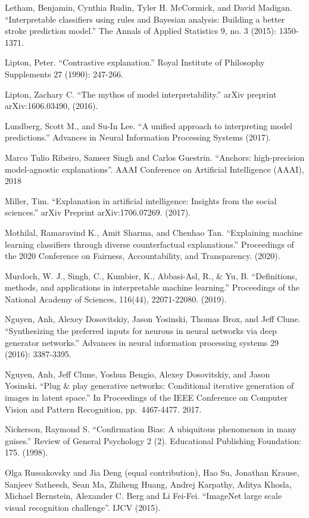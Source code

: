 \documentclass[
  11pt,
]{scrbook}
\begin{document}
Letham, Benjamin, Cynthia Rudin, Tyler H. McCormick, and David Madigan. ``Interpretable classifiers using rules and Bayesian analysis: Building a better stroke prediction model.'' The Annals of Applied Statistics 9, no. 3 (2015): 1350-1371.

Lipton, Peter. ``Contrastive explanation.'' Royal Institute of Philosophy Supplements 27 (1990): 247-266.

Lipton, Zachary C. ``The mythos of model interpretability.'' arXiv preprint arXiv:1606.03490, (2016).

Lundberg, Scott M., and Su-In Lee. ``A unified approach to interpreting model predictions.'' Advances in Neural Information Processing Systems (2017).

Marco Tulio Ribeiro, Sameer Singh and Carlos Guestrin. ``Anchors: high-precision model-agnostic explanations''. AAAI Conference on Artificial Intelligence (AAAI), 2018

Miller, Tim. ``Explanation in artificial intelligence: Insights from the social sciences.'' arXiv Preprint arXiv:1706.07269. (2017).

Mothilal, Ramaravind K., Amit Sharma, and Chenhao Tan. ``Explaining machine learning classifiers through diverse counterfactual explanations.'' Proceedings of the 2020 Conference on Fairness, Accountability, and Transparency. (2020).

Murdoch, W. J., Singh, C., Kumbier, K., Abbasi-Asl, R., \& Yu, B. ``Definitions, methods, and applications in interpretable machine learning.'' Proceedings of the National Academy of Sciences, 116(44), 22071-22080. (2019).

Nguyen, Anh, Alexey Dosovitskiy, Jason Yosinski, Thomas Brox, and Jeff Clune. ``Synthesizing the preferred inputs for neurons in neural networks via deep generator networks.'' Advances in neural information processing systems 29 (2016): 3387-3395.

Nguyen, Anh, Jeff Clune, Yoshua Bengio, Alexey Dosovitskiy, and Jason Yosinski. ``Plug \& play generative networks: Conditional iterative generation of images in latent space.'' In Proceedings of the IEEE Conference on Computer Vision and Pattern Recognition, pp.~4467-4477. 2017.

Nickerson, Raymond S. ``Confirmation Bias: A ubiquitous phenomenon in many guises.'' Review of General Psychology 2 (2). Educational Publishing Foundation: 175. (1998).

Olga Russakovsky and Jia Deng (equal contribution), Hao Su, Jonathan Krause, Sanjeev Satheesh, Sean Ma, Zhiheng Huang, Andrej Karpathy, Aditya Khosla, Michael Bernstein, Alexander C. Berg and Li Fei-Fei. ``ImageNet large scale visual recognition challenge''. IJCV (2015).
\end{document}
